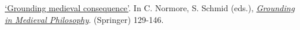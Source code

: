 	\item {}
{}
{
	\href{https://link.springer.com/chapter/10.1007/978-3-031-53666-3_6}{`Grounding medieval consequence'}. In C. Normore, S. Schmid (eds.), \href{https://link.springer.com/book/10.1007/978-3-031-53666-3}{\emph{Grounding in Medieval Philosophy}}. (Springer) 129-146.}
{}
